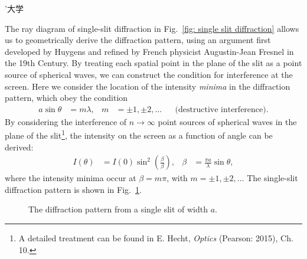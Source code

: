 ’大学\documentclass[addpoints]{physlabs}
\begin{document}
\begin{labsection}
\begin{theory}
    The ray diagram of single-slit diffraction in Fig.~\ref{fig: single slit diffraction} allows us to geometrically derive the diffraction pattern, using an argument first developed by Huygens and refined by French physicist Augustin-Jean Fresnel in the 19th Century. By treating each spatial point in the plane of the slit as a point source of spherical waves, we can construct the condition for interference at the screen. Here we consider the location of the intensity \textsl{minima} in the diffraction pattern, which obey the condition
    \begin{align}
        a\sin{\theta} &= m\lambda, &
        m &= \pm1,\pm2,\ldots &
        &\text{(destructive interference)}.
    \end{align}
    By considering the interference of $n\to\infty$ point sources of spherical waves in the plane of the slit\footnote{A detailed treatment can be found in E. Hecht, \textsl{Optics} (Pearson: 2015), Ch. 10.}, the intensity on the screen as a function of angle can be derived:
    \begin{align}\label{eq: single slit diffracion pattern}
        I(\theta) &= I(0)\sin^2{\left(\frac{\beta}{\beta}\right)},
        &
        \beta &= \frac{\pi a}{\lambda}\sin{\theta},
    \end{align}
    where the intensity minima occur at $\beta=m\pi$, with $m=\pm1,\pm2,\ldots$  The single-slit diffraction pattern is shown in Fig.~\ref{fig: diffraction intensity}.

    \begin{figure}[ht]
        \centering
        \caption{The diffraction pattern from a single slit of width $a$.}
        \label{fig: diffraction intensity}
    \end{figure}


\end{theory}
\end{labsection}
\end{document}
